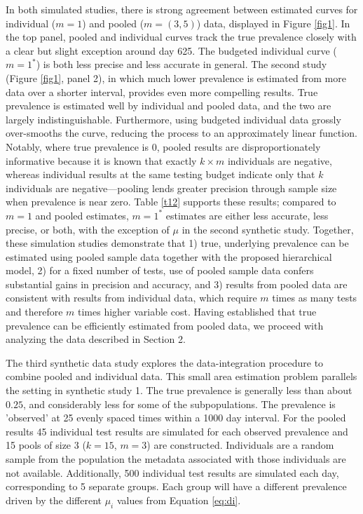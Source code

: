 \documentclass{article}
\begin{document}
In both simulated studies, there is strong agreement between estimated curves for individual ($m=1$) and pooled ($m=(3,5)$) data, displayed in Figure \ref{fig1}. In the top panel, pooled and individual curves track the true prevalence closely with a clear but slight exception around day 625. The budgeted individual curve ($m=1^*$) is both less precise and less accurate in general. The second study (Figure \ref{fig1}, panel 2), in which much lower prevalence is estimated from more data over a shorter interval, provides even more compelling results. True prevalence is estimated well by individual and pooled data, and the two are largely indistinguishable. Furthermore, using budgeted individual data grossly over-smooths the curve, reducing the process to an approximately linear function. Notably, where true prevalence is 0, pooled results are disproportionately informative because it is known that exactly $k\times m$ individuals are negative, whereas individual results at the same testing budget indicate only that $k$ individuals are negative—pooling lends greater precision through sample size when prevalence is near zero. Table \ref{t12} supports these results; compared to $m=1$ and pooled estimates, $m=1^*$ estimates are either less accurate, less precise, or both, with the exception of $\mu$ in the second synthetic study. Together, these simulation studies demonstrate that 1) true, underlying prevalence can be estimated using pooled sample data together with the proposed hierarchical model, 2) for a fixed number of tests, use of pooled sample data confers substantial gains in precision and accuracy, and 3) results from pooled data are consistent with results from individual data, which require $m$ times as many tests and therefore $m$ times higher variable cost. Having established that true prevalence can be efficiently estimated from pooled data, we proceed with analyzing the data described in Section 2.

The third synthetic data study explores the data-integration procedure to combine pooled and individual data. This small area estimation problem parallels the setting in synthetic study 1. The true prevalence is generally less than about $0.25$, and considerably less for some of the subpopulations. The prevalence is 'observed' at 25 evenly spaced times within a 1000 day interval. For the pooled results 45 individual test results are simulated for each observed prevalence and 15 pools of size 3 ($k=15$, $m=3$) are constructed. Individuals are a random sample from the population the metadata associated with those individuals are not available. Additionally, 500 individual test results are simulated each day, corresponding to 5 separate groups. Each group will have a different prevalence driven by the different $\mu_i$ values from Equation \ref{eq:di}.
\end{document}
